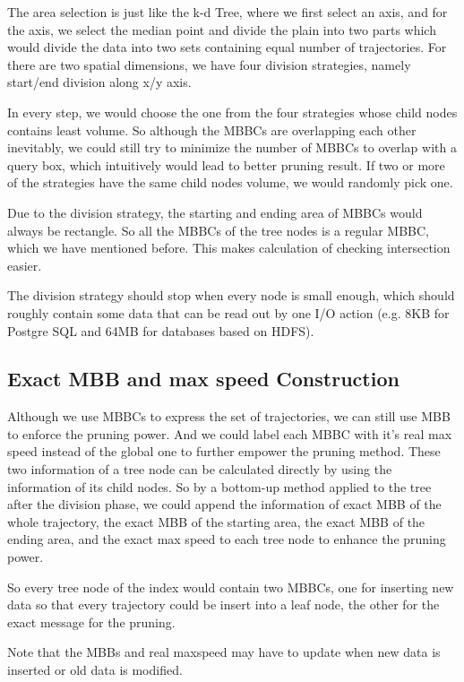 \documentclass[sigplan]{acmart}
\begin{document}
The area selection is just like the k-d Tree, where we first select an axis, and for the axis, we select the median point and divide the plain into two parts which would divide the data into two sets containing equal number of trajectories. For there are two spatial dimensions, we have four division strategies, namely start/end division along x/y axis.\par

In every step, we would choose the one from the four strategies whose child nodes contains least volume. So although the MBBCs are overlapping each other inevitably, we could still try to minimize the number of MBBCs to overlap with a query box, which intuitively would lead to better pruning result. If two or more of the strategies have the same child nodes volume, we would randomly pick one.\par
Due to the division strategy, the starting and ending area of MBBCs would always be rectangle. So all the MBBCs of the tree nodes is a regular MBBC, which we have mentioned before. This makes calculation of checking intersection easier.\par

The division strategy should stop when every node is small enough, which should roughly contain some data that can be read out by one I/O action (e.g. 8KB for Postgre SQL and 64MB for databases based on HDFS).

\subsection{Exact MBB and max speed Construction}
Although we use MBBCs to express the set of trajectories, we can still use MBB to enforce the pruning power. And we could label each MBBC with it's real max speed instead of the global one to further empower the pruning method. These two information of a tree node can be calculated directly by using the information of its child nodes. So by a bottom-up method applied to the tree after the division phase, we could append the information of exact MBB of the whole trajectory, the exact MBB of the starting area, the exact MBB of the ending area, and the exact max speed to each tree node to enhance the pruning power. \par
So every tree node of the index would contain two MBBCs, one for inserting new data so that every trajectory could be insert into a leaf node, the other for the exact message for the pruning.\par
Note that the MBBs and real maxspeed may have to update when new data is inserted or old data is modified.\par
\end{document}
